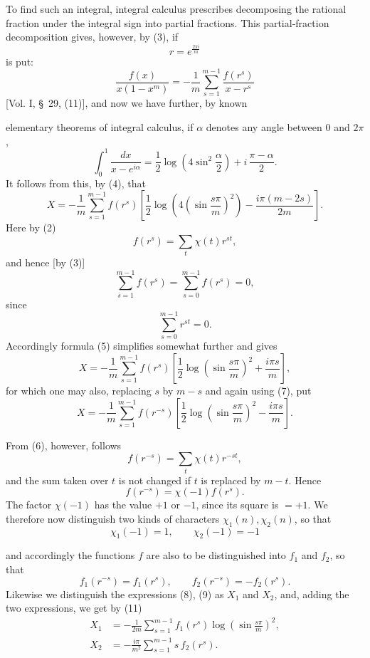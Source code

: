 \documentclass[11pt]{article}
\begin{document}
To find such an integral, integral calculus prescribes decomposing the rational fraction under the integral sign into partial fractions. This partial-fraction decomposition gives, however, by (3), if
\[
r=e^{\frac{2\pi i}{m}}
\]
is put:
\[
\frac{f(x)}{x(1-x^m)}
=-\frac1m\sum_{s=1}^{m-1}\frac{f(r^s)}{x-r^s}
\]
[Vol. I, \S~29, (11)], and now we have further, by known

elementary theorems of integral calculus, if $\alpha$ denotes any angle between $0$ and $2\pi$,
\[
\int_0^1\frac{dx}{x-e^{i\alpha}}
=\frac12\log\left(4\sin^2\frac{\alpha}{2}\right)
+i\,\frac{\pi-\alpha}{2}.
\]
It follows from this, by (4), that
\begin{equation}
X=-\frac1m\sum_{s=1}^{m-1}f(r^s)
\left[\frac12\log\left(4\left(\sin\frac{s\pi}{m}\right)^2\right)-\frac{i\pi(m-2s)}{2m}\right].
\tag{5}
\end{equation}
Here by (2)
\begin{equation}
f(r^s)=\sum_t\chi(t)r^{st},
\tag{6}
\end{equation}
and hence [by (3)]
\begin{equation}
\sum_{s=1}^{m-1}f(r^s)=\sum_{s=0}^{m-1}f(r^s)=0,
\tag{7}
\end{equation}
since
\[
\sum_{s=0}^{m-1}r^{st}=0.
\]
Accordingly formula (5) simplifies somewhat further and gives
\begin{equation}
X=-\frac1m\sum_{s=1}^{m-1}f(r^s)
\left[\frac12\log\left(\sin\frac{s\pi}{m}\right)^2+\frac{i\pi s}{m}\right],
\tag{8}
\end{equation}
for which one may also, replacing $s$ by $m-s$ and again using (7), put
\begin{equation}
X=-\frac1m\sum_{s=1}^{m-1}f(r^{-s})
\left[\frac12\log\left(\sin\frac{s\pi}{m}\right)^2-\frac{i\pi s}{m}\right].
\tag{9}
\end{equation}

From (6), however, follows
\[
f(r^{-s})=\sum_t\chi(t)r^{-st},
\]
and the sum taken over $t$ is not changed if $t$ is replaced by $m-t$. Hence
\[
f(r^{-s})=\chi(-1)f(r^s).
\]
The factor $\chi(-1)$ has the value $+1$ or $-1$, since its square is $=+1$. We therefore now distinguish two kinds of characters $\chi_1(n),\chi_2(n)$, so that
\begin{equation}
\chi_1(-1)=1,\qquad \chi_2(-1)=-1
\tag{10}
\end{equation}

and accordingly the functions $f$ are also to be distinguished into $f_1$ and $f_2$, so that
\begin{equation}
f_1(r^{-s})=f_1(r^s),\qquad f_2(r^{-s})=-f_2(r^s).
\tag{11}
\end{equation}
Likewise we distinguish the expressions (8), (9) as $X_1$ and $X_2$, and, adding the two expressions, we get by (11)
\begin{equation}
\begin{aligned}
X_1&=-\frac1{2m}\sum_{s=1}^{m-1}f_1(r^s)\log\left(\sin\frac{s\pi}{m}\right)^2,\\
X_2&=-\frac{i\pi}{m^2}\sum_{s=1}^{m-1}s\,f_2(r^s).
\end{aligned}
\tag{12}
\end{equation}
\end{document}
